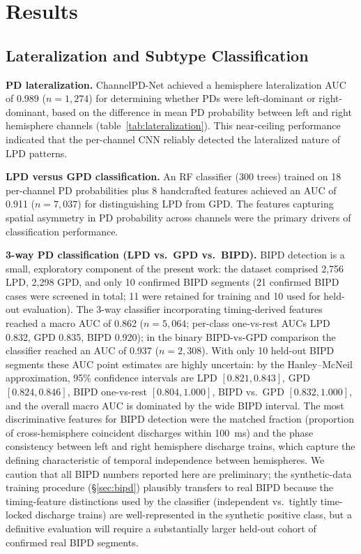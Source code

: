 \documentclass{iopjournal}
\begin{document}
\section{Results}
\label{sec:results}

\subsection{Lateralization and Subtype Classification}
\label{sec:lateralization}

\textbf{PD lateralization.} ChannelPD-Net achieved a hemisphere lateralization AUC of 0.989 ($n = 1{,}274$) for determining whether PDs were left-dominant or right-dominant, based on the difference in mean PD probability between left and right hemisphere channels (table~\ref{tab:lateralization}). This near-ceiling performance indicated that the per-channel CNN reliably detected the lateralized nature of LPD patterns.

\textbf{LPD versus GPD classification.} An RF classifier (300 trees) trained on 18 per-channel PD probabilities plus 8 handcrafted features achieved an AUC of 0.911 ($n = 7{,}037$) for distinguishing LPD from GPD. The features capturing spatial asymmetry in PD probability across channels were the primary drivers of classification performance.

\textbf{3-way PD classification (LPD vs.\ GPD vs.\ BIPD).} BIPD detection is a small, exploratory component of the present work: the dataset comprised 2{,}756 LPD, 2{,}298 GPD, and only 10 confirmed BIPD segments (21 confirmed BIPD cases were screened in total; 11 were retained for training and 10 used for held-out evaluation). The 3-way classifier incorporating timing-derived features reached a macro AUC of 0.862 ($n = 5{,}064$; per-class one-vs-rest AUCs LPD 0.832, GPD 0.835, BIPD 0.920); in the binary BIPD-vs-GPD comparison the classifier reached an AUC of 0.937 ($n = 2{,}308$). With only 10 held-out BIPD segments these AUC point estimates are highly uncertain: by the Hanley--McNeil approximation, 95\% confidence intervals are LPD $[0.821, 0.843]$, GPD $[0.824, 0.846]$, BIPD one-vs-rest $[0.804, 1.000]$, BIPD vs.\ GPD $[0.832, 1.000]$, and the overall macro AUC is dominated by the wide BIPD interval. The most discriminative features for BIPD detection were the matched fraction (proportion of cross-hemisphere coincident discharges within 100~ms) and the phase consistency between left and right hemisphere discharge trains, which capture the defining characteristic of temporal independence between hemispheres. We caution that all BIPD numbers reported here are preliminary; the synthetic-data training procedure (\S\ref{sec:bipd}) plausibly transfers to real BIPD because the timing-feature distinctions used by the classifier (independent vs.\ tightly time-locked discharge trains) are well-represented in the synthetic positive class, but a definitive evaluation will require a substantially larger held-out cohort of confirmed real BIPD segments.
\end{document}
